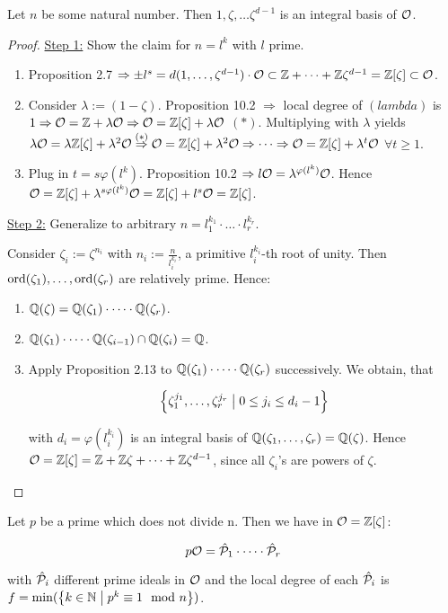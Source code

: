 \begin{Prop}
	Let $n$ be some natural number. Then $1, \zeta, \dots \zeta^{d-1}$ is an integral basis of $\mathcal{O}$.
\end{Prop}
\begin{proof}
	\underline{Step 1:} Show the claim for $n = l^k$ with $l$ prime.
	
	\begin{enumerate}[(1)]
		\item Proposition 2.7 $\Rightarrow \pm l^s = d(1, \dots, \zeta^{d-1}) \cdot \mathcal{O} \subset \mathbb{Z} + \dots + \mathbb{Z} \zeta^{d-1} = \mathbb{Z}[\zeta] \subset \mathcal{O}$.
		
		\item Consider $\lambda := (1-\zeta)$. Proposition 10.2 $\Rightarrow$ local degree of $(lambda)$ is $1 \Rightarrow \mathcal{O} = \mathbb{Z} + \lambda \mathcal{O} \Rightarrow \mathcal{O} = \mathbb{Z}[\zeta] + \lambda \mathcal{O}$ \vspace{2mm} $(*)$. Multiplying with $\lambda$ yields $\lambda \mathcal{O} = \lambda \mathbb{Z}[\zeta] + \lambda^2 \mathcal{O} \overset{(*)}{\Rightarrow} \mathcal{O} = \mathbb{Z}[\zeta] + \lambda^2 \mathcal{O} \Rightarrow \dots \Rightarrow \mathcal{O} = \mathbb{Z}[\zeta] + \lambda^t \mathcal{O}$ $\forall t \geq 1$.
		
		\item Plug in $t = s\varphi(l^k)$. Proposition 10.2 $\Rightarrow l \mathcal{O} = \lambda^{\varphi(l^k)} \mathcal{O}$. Hence $\mathcal{O} = \mathbb{Z}[\zeta] + \lambda^{s \varphi(l^k)} \mathcal{O} =  \mathbb{Z}[\zeta] + l^s \mathcal{O} = \mathbb{Z}[\zeta]$.
	\end{enumerate}

	\bigskip
	
	\underline{Step 2:} Generalize to arbitrary $n = l_1^{k_1} \cdot \dots \cdot l_r^{k_r}$.
		
	Consider $\zeta_i := \zeta^{n_i}$ with $n_i := \frac{n}{l_i^{k_i}}$, a primitive $l_i^{k_i}$-th root of unity. Then $\operatorname{ord}(\zeta_1), \dots, \operatorname{ord}(\zeta_r)$ are relatively prime. Hence:
	
	\begin{enumerate}[(1)]
		\item $\mathbb{Q}(\zeta) = \mathbb{Q}(\zeta_1) \cdot \dots \cdot \mathbb{Q}(\zeta_r)$.
		
		\item $\mathbb{Q}(\zeta_1) \cdot \dots \cdot \mathbb{Q}(\zeta_{i-1}) \cap \mathbb{Q}(\zeta_i) = \mathbb{Q}$.
		
		\item Apply Proposition 2.13 to $\mathbb{Q}(\zeta_1) \cdot \dots \cdot \mathbb{Q}(\zeta_r)$ successively. We obtain, that
		
		\[\left\{ {\zeta_1^{j_1}, \dots, \zeta_r^{j_r}} \bigm| {0 \leq j_i \leq d_i -1} \right\} \]
		
		with $d_i = \varphi(l_i^{k_i})$ is an integral basis of $\mathbb{Q}(\zeta_1, \dots, \zeta_r) = \mathbb{Q}(\zeta)$. Hence $\mathcal{O} = \mathbb{Z}[\zeta] = \mathbb{Z} + \mathbb{Z} \zeta + \dots + \mathbb{Z} \zeta^{d-1}$, since all $\zeta_i$'s are powers of $\zeta$.
	\end{enumerate}
\end{proof}

\begin{Lem}
	Let $p$ be a prime which does not divide n. Then we have in $\mathcal{O} = \mathbb{Z}[\zeta]$:
	
	\[ p \mathcal{O} = \hat{\mathcal{P}}_1 \cdot \dots \cdot \hat{\mathcal{P}}_r  	\]
	
	with $\hat{\mathcal{P}}_i$ different prime ideals in $\mathcal{O}$ and the local degree of each $\hat{\mathcal{P}}_i$ is \newline $f = \min(\left\{ {k \in \mathbb{N}} \bigm| {p^k \equiv 1 \mod n} \right\})$.
\end{Lem}